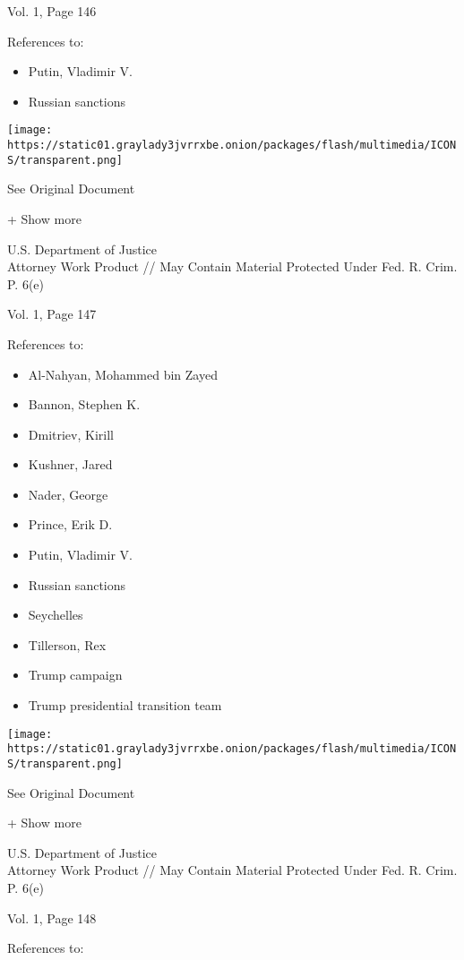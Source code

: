Vol. 1, Page 146

References to:

\begin{itemize}
\tightlist
\item
  Putin, Vladimir V.
\item
  Russian sanctions
\end{itemize}

\protect\hyperlink{}{}

\texttt{[image: https://static01.graylady3jvrrxbe.onion/packages/flash/multimedia/ICONS/transparent.png]}

See Original Document

+ Show more

U.S. Department of Justice\\
Attorney Work Product // May Contain Material Protected Under Fed. R.
Crim. P. 6(e)

Vol. 1, Page 147

References to:

\begin{itemize}
\tightlist
\item
  Al-Nahyan, Mohammed bin Zayed
\item
  Bannon, Stephen K.
\item
  Dmitriev, Kirill
\item
  Kushner, Jared
\item
  Nader, George
\item
  Prince, Erik D.
\item
  Putin, Vladimir V.
\item
  Russian sanctions
\item
  Seychelles
\item
  Tillerson, Rex
\item
  Trump campaign
\item
  Trump presidential transition team
\end{itemize}

\protect\hyperlink{}{}

\texttt{[image: https://static01.graylady3jvrrxbe.onion/packages/flash/multimedia/ICONS/transparent.png]}

See Original Document

+ Show more

U.S. Department of Justice\\
Attorney Work Product // May Contain Material Protected Under Fed. R.
Crim. P. 6(e)

Vol. 1, Page 148

References to:

